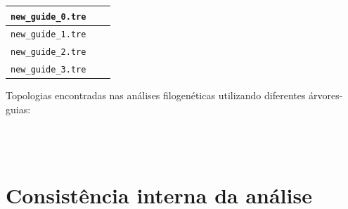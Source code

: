 \begin{refsection}
\begin{center}
\begin{longtable}{|c|c|c|}
\hline \texttt{new\_guide\_0.tre} &  & \\
\hline \texttt{new\_guide\_1.tre} &  & \\
\hline \texttt{new\_guide\_2.tre} &  & \\
\hline \texttt{new\_guide\_3.tre} &  & \\

\end{longtable}
\end{center}


\newpage
Topologias encontradas nas análises filogenéticas utilizando diferentes árvores-guias:

\begin{center}
\\
\\
\end{center}

\section{Consistência interna da análise}\label{tut8:consistency}


\end{refsection}
